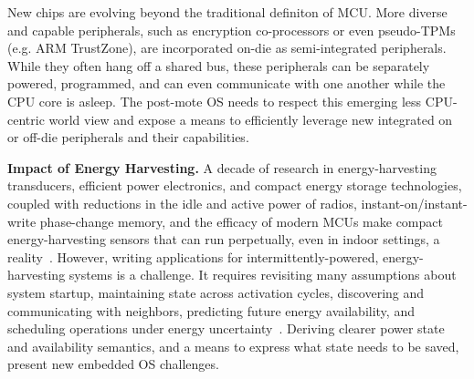 New chips are evolving beyond the traditional definiton of MCU.  More diverse
and capable peripherals, such as encryption co-processors or even pseudo-TPMs
(e.g. ARM TrustZone), are incorporated on-die as semi-integrated peripherals.
While they often hang off a shared bus, these peripherals can be separately
powered, programmed, and can even communicate with one another while the CPU
core is asleep. The post-mote OS needs to respect this emerging less
CPU-centric world view and expose a means to efficiently leverage new
integrated on or off-die peripherals and their capabilities.


%

\smallskip\noindent
\textbf{Impact of Energy Harvesting.}
%
%
A decade of research in energy-harvesting transducers, efficient power
electronics, and compact energy storage technologies, coupled
with reductions in the idle and active power of radios,
instant-on/instant-write phase-change memory, and the efficacy of modern MCUs
make compact energy-harvesting sensors that can run perpetually, even in
indoor settings, a reality~\cite{doubledip}.
%
However, writing applications for intermittently-powered,
energy-harvesting systems is a challenge.  It requires revisiting many
assumptions about system startup, maintaining state across activation cycles,
discovering and communicating with neighbors, predicting future energy
availability, and scheduling operations under energy uncertainty~\cite{dewdrop}.
%
Deriving clearer power state and availability semantics, and a means to express
what state needs to be saved, present new embedded OS challenges.

